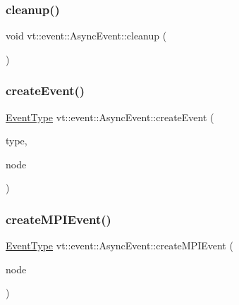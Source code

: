 \subsubsection{\texorpdfstring{cleanup()}{cleanup()}}
{\footnotesize\ttfamily void vt\+::event\+::\+Async\+Event\+::cleanup (\begin{DoxyParamCaption}{ }\end{DoxyParamCaption})}

\mbox{\label{structvt_1_1event_1_1_async_event_abc1629d13f9f3391e5e7f9ebc6303265}} 
\subsubsection{\texorpdfstring{create\+Event()}{createEvent()}}
{\footnotesize\ttfamily \hyperlink{namespacevt_a009267401def7ae8bf201892222d060f}{Event\+Type} vt\+::event\+::\+Async\+Event\+::create\+Event (\begin{DoxyParamCaption}\item[{\hyperlink{namespacevt_1_1event_a1ea9fec44d101bf40b8fd786d44ebed9}{Event\+Record\+Type\+Type} const \&}]{type,  }\item[{\hyperlink{namespacevt_a866da9d0efc19c0a1ce79e9e492f47e2}{Node\+Type} const \&}]{node }\end{DoxyParamCaption})}

\mbox{\label{structvt_1_1event_1_1_async_event_ae94bb2059c35857a228fd55ab5512272}} 
\subsubsection{\texorpdfstring{create\+M\+P\+I\+Event()}{createMPIEvent()}}
{\footnotesize\ttfamily \hyperlink{namespacevt_a009267401def7ae8bf201892222d060f}{Event\+Type} vt\+::event\+::\+Async\+Event\+::create\+M\+P\+I\+Event (\begin{DoxyParamCaption}\item[{\hyperlink{namespacevt_a866da9d0efc19c0a1ce79e9e492f47e2}{Node\+Type} const \&}]{node }\end{DoxyParamCaption})}

